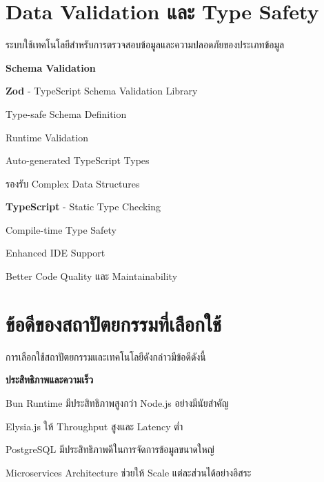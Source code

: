 \section{Data Validation และ Type Safety}
\hspace*{1.5em}
ระบบใช้เทคโนโลยีสำหรับการตรวจสอบข้อมูลและความปลอดภัยของประเภทข้อมูล

\vspace{0.5em}
\textbf{Schema Validation}
\vspace{0.5em}

\begin{mycustomenum2}
    \item \textbf{Zod} - TypeScript Schema Validation Library
    \begin{mycustomenum2}
        \item Type-safe Schema Definition
        \item Runtime Validation
        \item Auto-generated TypeScript Types
        \item รองรับ Complex Data Structures
    \end{mycustomenum2}

    \item \textbf{TypeScript} - Static Type Checking
    \begin{mycustomenum2}
        \item Compile-time Type Safety
        \item Enhanced IDE Support
        \item Better Code Quality และ Maintainability
    \end{mycustomenum2}
\end{mycustomenum2}

\section{ข้อดีของสถาปัตยกรรมที่เลือกใช้}
\hspace*{1.5em}
การเลือกใช้สถาปัตยกรรมและเทคโนโลยีดังกล่าวมีข้อดีดังนี้

\vspace{0.5em}
\textbf{ประสิทธิภาพและความเร็ว}
\vspace{0.5em}

\begin{mycustomenum2}
    \item Bun Runtime มีประสิทธิภาพสูงกว่า Node.js อย่างมีนัยสำคัญ
    \item Elysia.js ให้ Throughput สูงและ Latency ต่ำ
    \item PostgreSQL มีประสิทธิภาพดีในการจัดการข้อมูลขนาดใหญ่
    \item Microservices Architecture ช่วยให้ Scale แต่ละส่วนได้อย่างอิสระ
\end{mycustomenum2}

